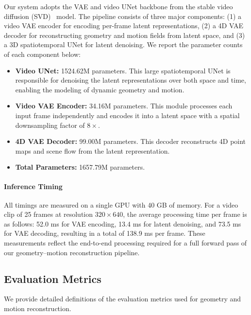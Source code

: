 Our system adopts the VAE and video UNet backbone from the 
stable video diffusion (SVD)~\cite{blattmann2023stable} model.
The pipeline consists of three major components: 
(1) a video VAE encoder for encoding per-frame latent representations,
(2) a 4D VAE decoder for reconstructing geometry and motion fields from latent space,
and (3) a 3D spatiotemporal UNet for latent denoising.
We report the parameter counts of each component below:
\begin{itemize}
    \item \textbf{Video UNet:} 1524.62M parameters.  
    This large spatiotemporal UNet is responsible for denoising the latent
    representations over both space and time, enabling the modeling of dynamic
    geometry and motion.

    \item \textbf{Video VAE Encoder:} 34.16M parameters.  
    This module processes each input frame independently and encodes it into
    a latent space with a spatial downsampling factor of $8\times$.

    \item \textbf{4D VAE Decoder:} 99.00M parameters.  
    This decoder reconstructs 4D point maps and scene flow from the latent
    representation.

    \item \textbf{Total Parameters:} 1657.79M parameters.
\end{itemize}

\paragraph{Inference Timing}
All timings are measured on a single GPU with 40 GB of memory.
For a video clip of {25 frames} at resolution \textbf{$320\times640$}, the average processing time per frame is as follows: 
52.0 ms for VAE encoding, 13.4 ms for latent denoising, and 73.5 ms for VAE
decoding, resulting in a total of 138.9 ms per frame.
% 
These measurements reflect the end-to-end processing required for a full forward
pass of our geometry–motion reconstruction pipeline.

\subsection{Evaluation Metrics}

We provide detailed definitions of the evaluation metrics used for geometry and motion reconstruction.

